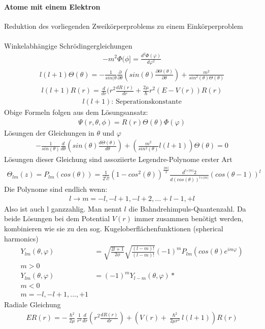 \documentclass[10pt,a4paper]{article}
\begin{document}
\paragraph{Atome mit einem Elektron} $\,$ \\
Reduktion des vorliegenden Zweikörperproblems zu einem Einkörperproblem $\,$\\
\\
Winkelabhängige Schrödingergleichungen
\begin{align}
-m^2 \Phi(\phi]=\frac{d^2 \Phi(\varphi)}{d \varphi^2}
\end{align}
\begin{align}
l(l+1)\Theta(\theta)=-\frac{1}{sin(\theta}\frac{\partial}{\partial \theta} (sin(\theta)\frac{\partial \Theta(\theta)}{\partial \theta})+\frac{m^2}{sin^2(\theta) \Theta(\theta)}
\end{align}
\begin{align}
l(l+1)R(r)=\frac{d}{dr}(r^2 \frac{d R(r)}{d r}+\frac{2\mu}{\hslash} r^2 (E-V(r)) R(r)
\end{align}
\begin{align}
l(l+1)\text{: Seperationskonstante}
\end{align}
Obige Formeln folgen aus dem Lösungsansatz:
\begin{align}
\Psi (r,\theta , \phi )=R(r) \Theta (\theta) \Phi (\varphi)
\end{align}
Lösungen der Gleichungen in $\theta $ und $\varphi $
\begin{align}
-\frac{1}{sin(\theta)} \frac{d}{d \theta} (sin(\theta) \frac{d \Theta (\theta)}{d \theta})+(\frac{m^2}{sin^2(\theta)} l(l+1)) \Theta (\theta) =0
\end{align}
Lösungen dieser Gleichung sind assoziierte Legendre-Polynome erster Art
\begin{align}
\Theta_{lm}(z)=P_{lm} (cos(\theta))=\frac{1}{2^ll!} (1-cos^2(\theta))^{\frac{\vert m \vert}{2}} \frac{d^{l+ \vert m \vert}{2}}{d (cos(\theta))^{l+\vert m \vert }} (cos(\theta - 1))^l
\end{align}
Die Polynome sind endlich wenn:
\begin{align}
l \rightarrow m = -l, -l+1, -l+2,...+l-1, +l
\end{align}
Also ist auch l ganzzahlig. Man nennt $l$ die Bahndrehimpuls-Quantenzahl.
Da beide Lösungen bei dem Potential $V(r)$ immer zusammen benötigt werden, kombinieren wie sie zu den sog. Kugeloberflächenfunktionen (spherical harmonics)
\begin{align}
Y_{lm} (\theta , \varphi ) & = \sqrt{\frac{2 l+1}{2 \phi}} \sqrt{\frac{(l-m)!}{(l-m)!}} (-1)^m P_{lm} (cos(\theta ) e^{i m \varphi})\\
m>0\\
Y_{lm}(\theta ,\varphi )& = (-1)^m Y_{l-m} (\theta , \varphi )*\\
m<0\\
m=-l, -l+1,...,+1
\end{align}
Radiale Gleichung
\begin{align}
E R(r)=-\frac{\hslash ^2}{2 \mu} \frac{1}{r^2} \frac{d}{dr} (r^2 \frac{d R(r)}{dr})+(V(r) + \frac{\hslash ^2}{2 \mu r^2} l(l+1)) R(r)
\end{align}
\end{document}
